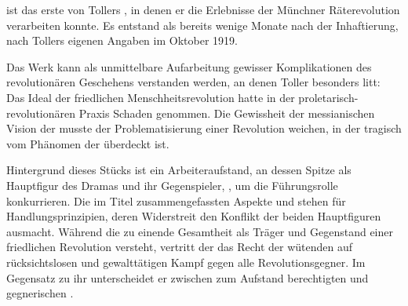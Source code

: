

 ist das erste von Tollers \Cite{Gefängnisdramen}, in
denen er die Erlebnisse der Münchner Räterevolution verarbeiten
konnte.
Es entstand als \Cite{erste Niederschrift} bereits wenige Monate nach der
Inhaftierung, nach Tollers eigenen Angaben im Oktober 1919. 

Das Werk kann als unmittelbare Aufarbeitung gewisser Komplikationen des
revolutionären
Geschehens verstanden werden, an denen Toller besonders litt: Das Ideal der
friedlichen Menschheitsrevolution hatte in der proletarisch-revolutionären
Praxis Schaden genommen. Die Gewissheit der messianischen Vision der
 musste der Problematisierung einer Revolution weichen, in
der \Cite{der Mensch} tragisch vom Phänomen der \Cite{Masse} überdeckt
ist.


Hintergrund dieses Stücks \Cite{aus der sozialen Revolution des
20. Jahrhunderts}  ist ein Arbeiteraufstand, an dessen
Spitze \Cite{die Frau}
als Hauptfigur des Dramas und ihr Gegenspieler, \Cite{der Namenlose}, um die
Führungsrolle konkurrieren. Die im Titel zusammengefassten Aspekte
\Cite{Masse} und \Cite{Mensch} stehen für Handlungsprinzipien, deren
Widerstreit den Konflikt der beiden Hauptfiguren ausmacht. Während \Cite{die Frau}
die zu einende Gesamtheit \Cite{der Menschen} als Träger und Gegenstand einer
friedlichen Revolution versteht, vertritt der \Cite{Namenlose} das Recht der
wütenden \Cite{Masse} auf rücksichtslosen und gewalttätigen Kampf gegen alle
Revolutionsgegner. Im Gegensatz zu ihr unterscheidet er zwischen zum Aufstand
berechtigten \Cite{Massenmenschen} und gegnerischen \Cite{Staatsmenschen}
.

